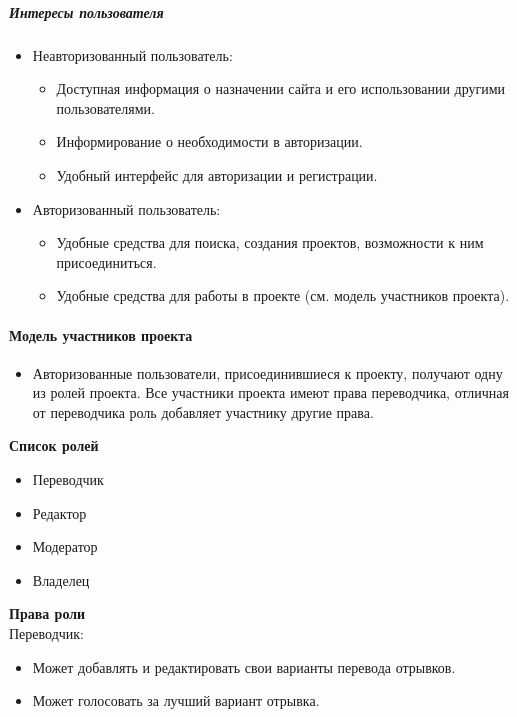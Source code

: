 \documentclass[a4paper,12pt]{article}
\begin{document}
\subparagraph{Интересы пользователя}

\begin{itemize}
\item Неавторизованный пользователь:
\begin{itemize}
\item Доступная информация о назначении сайта и его использовании другими пользователями.
\item Информирование о необходимости в авторизации.
\item Удобный интерфейс для авторизации и регистрации.
\end{itemize}

\item Авторизованный пользователь:
\begin{itemize}
\item Удобные средства для поиска, создания проектов, возможности к ним присоединиться.
\item Удобные средства для работы в проекте (см. модель участников проекта).
\end{itemize}
\end{itemize}

\paragraph{Модель участников проекта}

\begin{itemize}
\item Авторизованные пользователи, присоединившиеся к проекту, получают одну из ролей проекта. Все участники проекта имеют права переводчика, отличная от переводчика роль добавляет участнику другие права.
\end{itemize}

\textbf{Список ролей}

\begin{itemize}
\item Переводчик
\item Редактор
\item Модератор
\item Владелец
\end{itemize}


\textbf{Права роли}\\

Переводчик:

\begin{itemize}
\item Может добавлять и редактировать свои варианты перевода отрывков.
\item Может голосовать за лучший вариант отрывка.
\end{itemize}
\end{document}

